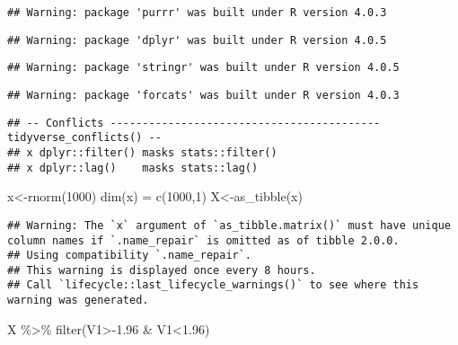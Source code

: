 \documentclass[
  12pt,
]{article}
\newenvironment{Shaded}{\begin{snugshade}}{\end{snugshade}}
\newcommand{\DecValTok}[1]{\textcolor[rgb]{0.00,0.00,0.81}{#1}}
\newcommand{\FloatTok}[1]{\textcolor[rgb]{0.00,0.00,0.81}{#1}}
\newcommand{\FunctionTok}[1]{\textcolor[rgb]{0.00,0.00,0.00}{#1}}
\newcommand{\NormalTok}[1]{#1}
\newcommand{\OtherTok}[1]{\textcolor[rgb]{0.56,0.35,0.01}{#1}}
\newcommand{\SpecialCharTok}[1]{\textcolor[rgb]{0.00,0.00,0.00}{#1}}
\begin{document}
\begin{verbatim}
## Warning: package 'purrr' was built under R version 4.0.3
\end{verbatim}

\begin{verbatim}
## Warning: package 'dplyr' was built under R version 4.0.5
\end{verbatim}

\begin{verbatim}
## Warning: package 'stringr' was built under R version 4.0.5
\end{verbatim}

\begin{verbatim}
## Warning: package 'forcats' was built under R version 4.0.3
\end{verbatim}

\begin{verbatim}
## -- Conflicts ------------------------------------------ tidyverse_conflicts() --
## x dplyr::filter() masks stats::filter()
## x dplyr::lag()    masks stats::lag()
\end{verbatim}

\begin{Shaded}
\begin{Highlighting}[]
\NormalTok{x}\OtherTok{\textless{}{-}}\FunctionTok{rnorm}\NormalTok{(}\DecValTok{1000}\NormalTok{)}
\FunctionTok{dim}\NormalTok{(x) }\OtherTok{=} \FunctionTok{c}\NormalTok{(}\DecValTok{1000}\NormalTok{,}\DecValTok{1}\NormalTok{)}
\NormalTok{X}\OtherTok{\textless{}{-}}\FunctionTok{as\_tibble}\NormalTok{(x)}
\end{Highlighting}
\end{Shaded}

\begin{verbatim}
## Warning: The `x` argument of `as_tibble.matrix()` must have unique column names if `.name_repair` is omitted as of tibble 2.0.0.
## Using compatibility `.name_repair`.
## This warning is displayed once every 8 hours.
## Call `lifecycle::last_lifecycle_warnings()` to see where this warning was generated.
\end{verbatim}

\begin{Shaded}
\begin{Highlighting}[]
\NormalTok{X }\SpecialCharTok{\%\textgreater{}\%} \FunctionTok{filter}\NormalTok{(V1}\SpecialCharTok{\textgreater{}{-}}\FloatTok{1.96} \SpecialCharTok{\&}\NormalTok{ V1}\SpecialCharTok{\textless{}}\FloatTok{1.96}\NormalTok{)}
\end{Highlighting}
\end{Shaded}
\end{document}
